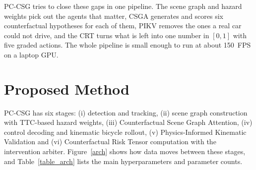 \documentclass[preprint,12pt]{elsarticle}
\begin{document}
PC-CSG tries to close these gaps in one pipeline. The scene graph and hazard weights pick out the agents that matter, CSGA generates and scores six counterfactual hypotheses for each of them, PIKV removes the ones a real car could not drive, and the CRT turns what is left into one number in $[0,1]$ with five graded actions. The whole pipeline is small enough to run at about 150~FPS on a laptop GPU.

\section{Proposed Method} \label{section3}
PC-CSG has six stages: (i) detection and tracking, (ii) scene graph construction with TTC-based hazard weights, (iii) Counterfactual Scene Graph Attention, (iv) control decoding and kinematic bicycle rollout, (v) Physics-Informed Kinematic Validation and (vi) Counterfactual Risk Tensor computation with the intervention arbiter. Figure~\ref{arch} shows how data moves between these stages, and Table~\ref{table_arch} lists the main hyperparameters and parameter counts.
\end{document}
